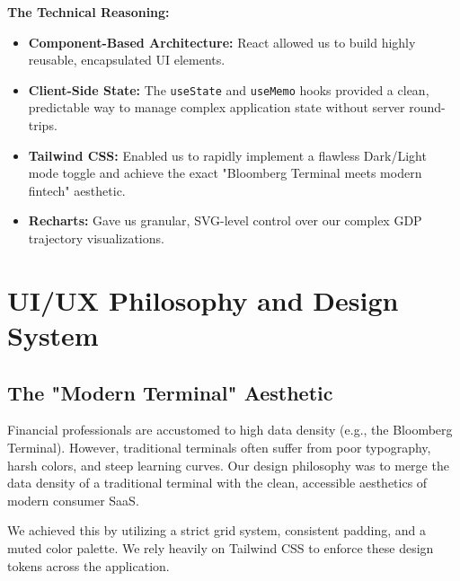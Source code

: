 \documentclass[12pt]{article}
\begin{document}
\textbf{The Technical Reasoning:} 
\begin{itemize}
    \item \textbf{Component-Based Architecture:} React allowed us to build highly reusable, encapsulated UI elements.
    \item \textbf{Client-Side State:} The \texttt{useState} and \texttt{useMemo} hooks provided a clean, predictable way to manage complex application state without server round-trips.
    \item \textbf{Tailwind CSS:} Enabled us to rapidly implement a flawless Dark/Light mode toggle and achieve the exact "Bloomberg Terminal meets modern fintech" aesthetic.
    \item \textbf{Recharts:} Gave us granular, SVG-level control over our complex GDP trajectory visualizations.
\end{itemize}

\section{UI/UX Philosophy and Design System}

\subsection{The "Modern Terminal" Aesthetic}
Financial professionals are accustomed to high data density (e.g., the Bloomberg Terminal). However, traditional terminals often suffer from poor typography, harsh colors, and steep learning curves. Our design philosophy was to merge the data density of a traditional terminal with the clean, accessible aesthetics of modern consumer SaaS.

We achieved this by utilizing a strict grid system, consistent padding, and a muted color palette. We rely heavily on Tailwind CSS to enforce these design tokens across the application.
\end{document}
